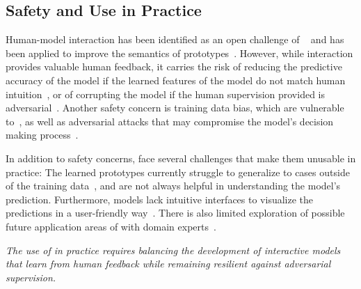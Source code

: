 
\subsection{\texorpdfstring{\colorbox[RGB]{242,96,119}{Safety and Use in Practice}}{Safety and Use in Practice}}
\label{ssec:chall:safety}

Human-model interaction has been identified as an open challenge of \ppms~\cite{Nauta2023_wcxai_co-12-for-prototype-models} and has been applied to improve the semantics of prototypes~\cite{Bontempelli_2023_ConceptlevelDebuggingPartPrototype,Li_2024_ImprovingPrototypicalVisual}.
However, while interaction provides valuable human feedback, it carries the risk of reducing the predictive accuracy of the model if the learned features of the model do not match human intuition~\cite{Li_2024_ImprovingPrototypicalVisual}, or of corrupting the model if the human supervision provided is adversarial~\cite{Bontempelli_2023_ConceptlevelDebuggingPartPrototype}.
Another safety concern is training data bias, which \ppms are vulnerable to~\cite{Carmichael_2024_ThisProbablyLooks}, as well as adversarial attacks that may compromise the model's decision making process~\cite{Rymarczyk_2023_ProtoMILMultipleInstance}.


In addition to safety concerns, \ppms face several challenges that make them unusable in practice: The learned prototypes currently struggle to generalize to cases outside of the training data~\citep{Wang_2023_PROMINETPrototypebasedMultiView}, and are not always helpful in understanding the model's prediction. Furthermore, models lack intuitive interfaces to visualize the predictions in a user-friendly way~\citep{Wang_2023_PROMINETPrototypebasedMultiView}. 
There is also limited exploration of possible future application areas of \ppms with domain experts~\cite{Fauvel_2023_LightweightEfficientExplainablebyDesign}.   

\textit{The use of \ppms in practice requires balancing the development of interactive models that learn from human feedback while remaining resilient against adversarial supervision.}


